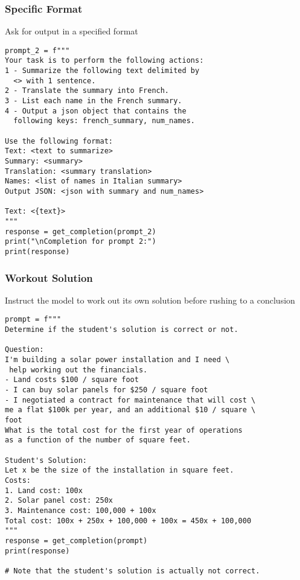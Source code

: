 \begin{frame}[fragile]\frametitle{Specific Format}

Ask for output in a specified format

\begin{lstlisting}
prompt_2 = f"""
Your task is to perform the following actions: 
1 - Summarize the following text delimited by 
  <> with 1 sentence.
2 - Translate the summary into French.
3 - List each name in the French summary.
4 - Output a json object that contains the 
  following keys: french_summary, num_names.

Use the following format:
Text: <text to summarize>
Summary: <summary>
Translation: <summary translation>
Names: <list of names in Italian summary>
Output JSON: <json with summary and num_names>

Text: <{text}>
"""
response = get_completion(prompt_2)
print("\nCompletion for prompt 2:")
print(response)
\end{lstlisting}
\end{frame}


\begin{frame}[fragile]\frametitle{Workout Solution}

Instruct the model to work out its own solution before rushing to a conclusion

{\tiny
\begin{lstlisting}
prompt = f"""
Determine if the student's solution is correct or not.

Question:
I'm building a solar power installation and I need \
 help working out the financials. 
- Land costs $100 / square foot
- I can buy solar panels for $250 / square foot
- I negotiated a contract for maintenance that will cost \ 
me a flat $100k per year, and an additional $10 / square \
foot
What is the total cost for the first year of operations 
as a function of the number of square feet.

Student's Solution:
Let x be the size of the installation in square feet.
Costs:
1. Land cost: 100x
2. Solar panel cost: 250x
3. Maintenance cost: 100,000 + 100x
Total cost: 100x + 250x + 100,000 + 100x = 450x + 100,000
"""
response = get_completion(prompt)
print(response)

# Note that the student's solution is actually not correct.
\end{lstlisting}
}

\end{frame}

